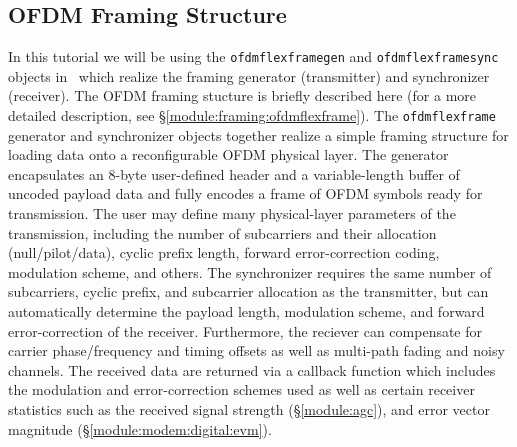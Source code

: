 %
%
\subsection{OFDM Framing Structure}
\label{tutorial:ofdmflexframe:structure}
%
In this tutorial we will be using the {\tt ofdmflexframegen} and
{\tt ofdmflexframesync} objects in \liquid\ which realize the
framing generator (transmitter) and synchronizer (receiver).
The OFDM framing stucture is briefly described here
(for a more detailed description, see
\S\ref{module:framing:ofdmflexframe}).
The {\tt ofdmflexframe} generator and synchronizer objects
together realize a simple framing structure
for loading data onto a reconfigurable OFDM physical layer.
The generator encapsulates an 8-byte user-defined header
and a variable-length buffer of uncoded payload data
and fully encodes a frame of OFDM symbols ready for transmission.
The user may define many physical-layer parameters of the transmission,
including
  the number of subcarriers and their allocation (null/pilot/data),
  cyclic prefix length,
  forward error-correction coding,
  modulation scheme,
  and others.
The synchronizer requires the same number of subcarriers, cyclic prefix,
and subcarrier allocation as the transmitter, but can automatically
determine the payload length, modulation scheme, and forward
error-correction of the receiver.
Furthermore, the reciever can compensate for carrier phase/frequency and
timing offsets as well as multi-path fading and noisy channels.
The received data are returned via a callback function which includes
the modulation and error-correction schemes used
as well as certain receiver statistics such as the
received signal strength (\S\ref{module:agc}),
and error vector magnitude (\S\ref{module:modem:digital:evm}).



%
%
